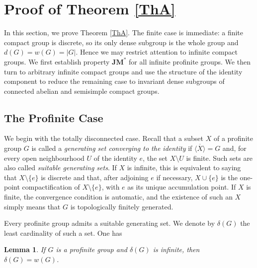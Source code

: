 \documentclass[12pt]{amsart}
\newtheorem{lemma}[theorem]{Lemma}
\theoremstyle{definition}
\numberwithin{equation}{section}
\theoremstyle{remark}
\def\JM{\mathbf{JM}}
\begin{document}




\section{Proof of Theorem \ref{ThA}}\label{s2}

In this section, we prove Theorem \ref{ThA}. The finite case is immediate: a finite compact group is discrete, so its only dense subgroup is the whole group and $d(G)=w(G)=|G|$. Hence we may restrict attention to infinite compact groups. We first establish property $\JM^*$ for all infinite profinite groups. We then turn to arbitrary infinite compact groups and use the structure of the identity component to reduce the remaining case to invariant dense subgroups of connected abelian and semisimple compact groups.


\subsection{The Profinite Case}

We begin with the totally disconnected case. Recall that a subset $X$ of a profinite group $G$ is called a \emph{generating set converging to the identity} if $\overline{\langle X\rangle}=G$
and, for every open neighbourhood $U$ of the identity $e$, the set $X\setminus U$ is finite. Such sets are also called \emph{suitable generating sets}. If $X$ is infinite, this is equivalent to saying that $X\setminus\{e\}$ is discrete and that, after adjoining $e$ if necessary, $X\cup\{e\}$ is the one-point compactification of $X\setminus\{e\}$, with $e$ as its unique accumulation point. If $X$ is finite, the convergence condition is automatic, and the existence of such an $X$ simply means that $G$ is topologically finitely generated.


Every profinite group admits a suitable generating set. We denote by $\delta(G)$ the least cardinality of such a set. One has
\begin{lemma}\label{delta=w}\cite[Proposition 2.6.1 and Corollary 2.6.3]{RZ}
If $G$ is a profinite group and $\delta(G)$ is infinite, then $\delta(G)=w(G)$.
\end{lemma}
\end{document}
